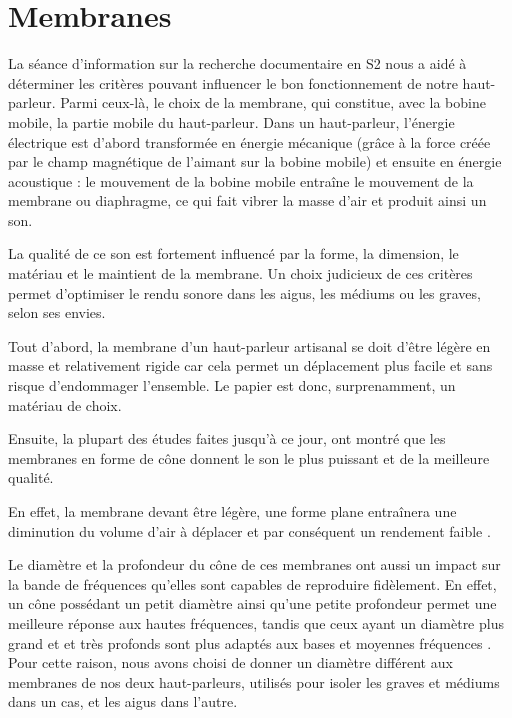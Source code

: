 \section{Membranes}

La séance d’information sur la recherche documentaire en S2
nous a aidé à déterminer les critères pouvant influencer
le bon fonctionnement de notre haut-parleur.
Parmi ceux-là, le choix de la membrane, qui constitue, avec la bobine mobile, la partie mobile
du haut-parleur. Dans un haut-parleur, l'énergie électrique est d'abord transformée en énergie mécanique (grâce à la force créée par le champ magnétique de l'aimant sur la bobine mobile) et ensuite en énergie acoustique : le mouvement de la bobine mobile entraîne le mouvement de la membrane ou diaphragme, ce qui fait vibrer la masse d'air et produit ainsi un son.

La qualité de ce son est fortement influencé par la forme, la dimension, le matériau et le maintient de la membrane.
Un choix judicieux de ces critères permet d'optimiser le rendu sonore dans les aigus, les médiums ou les graves, selon ses envies.

Tout d’abord, la membrane d’un haut-parleur artisanal
se doit d’être légère en masse et relativement rigide
car cela permet un déplacement plus facile et
sans risque d’endommager l’ensemble.
Le papier est donc, surprenamment, un matériau de choix.

Ensuite, la plupart des études faites jusqu’à ce jour,
ont montré que les membranes en forme de cône
donnent le son le plus puissant et de la meilleure qualité.

En effet, la membrane devant être légère, une forme plane entraînera une diminution du volume d’air à déplacer et par conséquent un rendement faible \cite{f1964compound}.

Le diamètre et la profondeur du cône de ces membranes
ont aussi un impact sur la bande de fréquences
qu’elles sont capables de reproduire fidèlement.
En effet, un cône possédant un petit diamètre ainsi qu'une petite profondeur
permet une meilleure réponse aux hautes fréquences,
tandis que ceux ayant un diamètre plus grand et et très profonds sont plus adaptés aux bases et moyennes fréquences \cite{Miller}.
Pour cette raison, nous avons choisi de donner un diamètre
différent aux membranes de nos deux haut-parleurs,
utilisés pour isoler les graves et médiums dans un cas,
et les aigus dans l'autre.

